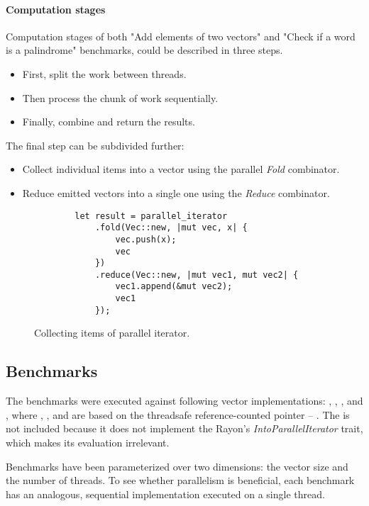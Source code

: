 \paragraph*{Computation stages}
Computation stages of both "Add elements of two vectors" and "Check if a word is a palindrome" benchmarks, could be described in three steps. 
\begin{itemize}
    \item First, split the work between threads. 
    \item Then process the chunk of work sequentially. 
    \item Finally, combine and return the results.    
\end{itemize}

The final step can be subdivided further:
\begin{itemize}
    \item Collect individual items into a vector using the parallel \emph{Fold} combinator. 
    \item Reduce emitted vectors into a single one using the \emph{Reduce} combinator. 
\end{itemize}

\begin{figure}[!htbp]
    \centering

    \begin{verbatim}
        let result = parallel_iterator
            .fold(Vec::new, |mut vec, x| {
                vec.push(x);
                vec
            })
            .reduce(Vec::new, |mut vec1, mut vec2| {
                vec1.append(&mut vec2);
                vec1
            });
    \end{verbatim}
    
    \caption{Collecting items of parallel iterator.}
    \label{fig:fold-reduce}
\end{figure}

\subsection{Benchmarks}
\label{sec:par-benchmarks}
The benchmarks were executed against following vector implementations: \stdvec{}, \rbvec{}, \rrbvec{}, and \pvec{}, where \rbvec{}, \rrbvec{}, and \pvec{} are based on the threadsafe reference-counted pointer -- \arc{}. The \imrsvec{} is not included because it does not implement the Rayon's \emph{IntoParallelIterator} trait, which makes its evaluation irrelevant. 

Benchmarks have been parameterized over two dimensions: the vector size and the number of threads. To see whether parallelism is beneficial, each benchmark has an analogous, sequential implementation executed on a single thread. 

